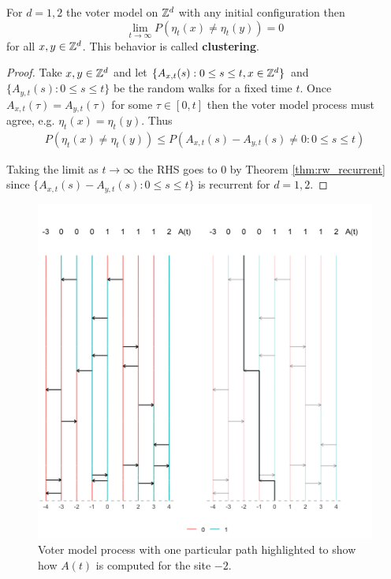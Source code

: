 \begin{theorem}
For $d = 1,2$ the voter model on $\mathbb{Z}^d$ with any initial configuration then
$$
\lim_{t \to \infty} P(\eta_t(x) \not = \eta_t(y)) = 0
$$
for all $x,y \in \mathbb{Z}^d$.
This behavior is called \textbf{clustering}.
\end{theorem}

\begin{proof}
Take $x, y \in \mathbb{Z}^d$ and let $\{A_{x,t}(s) : 0 \leq s \leq t, x \in \mathbb{Z}^d\}$ and $\{A_{y,t}(s) : 0 \leq s \leq t\}$ be the random walks for a fixed time $t$.
Once $A_{x,t}(\tau) = A_{y,t}(\tau)$ for some $\tau \in [0, t]$ then the voter model process must agree, e.g. $\eta_t(x) = \eta_t(y)$.
Thus
\begin{align*}
P(\eta_t(x) \not = \eta_t(y)) \leq P(A_{x,t}(s) - A_{y,t}(s) \not = 0 : 0 \leq s \leq t)
\end{align*}


Taking the limit as $t \to \infty$ the RHS goes to 0 by Theorem \ref{thm:rw_recurrent} since $\{A_{x,t}(s) - A_{y,t}(s) : 0 \leq s \leq t\}$ is recurrent for $d = 1,2$.
\end{proof}

\begin{figure}[H]
  \centering
    \includegraphics[width=1\textwidth]{figures/voter_model_dual.png}
   \caption{Voter model process with one particular path highlighted to show how $A(t)$ is computed for the site $-2$.}
  \label{fig:voter_model_dual}
\end{figure}

